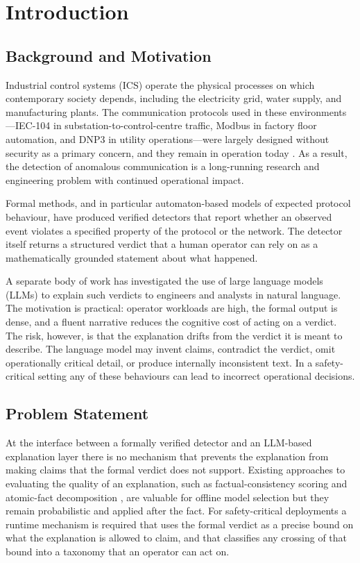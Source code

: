\chapter{Introduction}
\label{ch:introduction}

\section{Background and Motivation}
\label{sec:background}

Industrial control systems (ICS) operate the physical processes on which contemporary
society depends, including the electricity grid, water supply, and manufacturing
plants. The communication protocols used in these environments---IEC-104 in
substation-to-control-centre traffic, Modbus in factory floor automation,
and DNP3 in utility operations---were largely designed without security as a primary
concern, and they remain in operation today \autocite{HolikMatousekRysavyVojnar2023}.
As a result, the detection of anomalous communication is a long-running research and
engineering problem with continued operational impact.

Formal methods, and in particular automaton-based models of expected protocol
behaviour, have produced verified detectors that report whether an observed event
violates a specified property of the protocol or the network. The detector itself
returns a structured verdict that a human operator can rely on as a mathematically
grounded statement about what happened.

A separate body of work has investigated the use of large language models (LLMs) to
explain such verdicts to engineers and analysts in natural language. The motivation is
practical: operator workloads are high, the formal output is dense, and a fluent
narrative reduces the cognitive cost of acting on a verdict. The risk, however, is
that the explanation drifts from the verdict it is meant to describe. The language
model may invent claims, contradict the verdict, omit operationally critical detail,
or produce internally inconsistent text. In a safety-critical setting any of these
behaviours can lead to incorrect operational decisions.

\section{Problem Statement}
\label{sec:problem}

At the interface between a formally verified detector and an LLM-based explanation
layer there is no mechanism that prevents the explanation from making claims that the
formal verdict does not support. Existing approaches to evaluating the quality of an
explanation, such as factual-consistency scoring \autocite{Honovich2022True} and
atomic-fact decomposition \autocite{Min2023FActScore}, are valuable for offline model
selection but they remain probabilistic and applied after the fact. For safety-critical
deployments a runtime mechanism is required that uses the formal verdict as a precise
bound on what the explanation is allowed to claim, and that classifies any crossing of
that bound into a taxonomy that an operator can act on.

